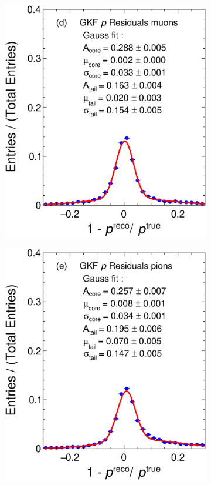 \begin{figure}[t]
\begin{subfigure}{0.32\textwidth}
         \includegraphics[width=\textwidth]{figures/ch5-KF_NDGAr/FullSample/Int/pRes/1D/RespGAr13.eps}
         \caption{}
         \label{fig:pResGKF13_Int}
     \end{subfigure}
     \begin{subfigure}{0.32\textwidth}
         \centering
         \includegraphics[width=\textwidth]{figures/ch5-KF_NDGAr/FullSample/Int/pRes/1D/RespGAr211.eps}

\end{subfigure}
\end{figure}
